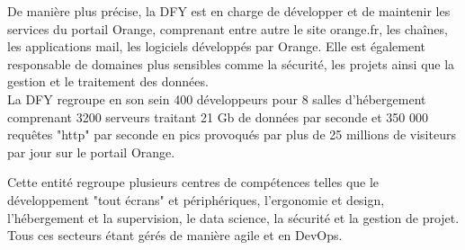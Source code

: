 De manière plus précise, la DFY est en charge de développer et de maintenir les services du portail Orange, comprenant entre autre le site orange.fr, les chaînes, les applications mail,  les logiciels développés par Orange.
Elle est également responsable de domaines plus sensibles comme la sécurité, les projets ainsi que la gestion et le traitement des données.\\

La DFY regroupe en son sein 400 développeurs pour 8 salles d’hébergement comprenant 3200 serveurs traitant 21 Gb de données par seconde et 350 000 requêtes "http" par seconde en pics provoqués par plus de 25 millions de visiteurs par jour sur le portail Orange.

Cette entité regroupe plusieurs centres de compétences telles que le développement "tout écrans" et périphériques, l'ergonomie et design, l'hébergement et la supervision, le data science, la sécurité et la gestion de projet. Tous ces secteurs étant gérés de manière agile et en DevOps. 

